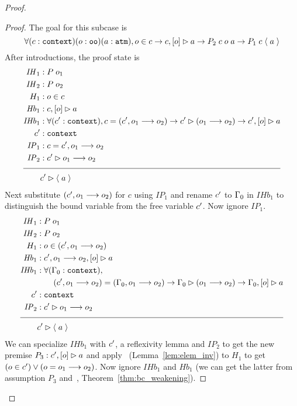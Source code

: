\begin{proof}
\begin{proof}
The goal for this subcase is
$$
\forall (c : \sltm{context}) (o : \sltm{oo}) (a : \sltm{atm}), o \in c \rightarrow \bchsl[c]{o}{a} \rightarrow P_2 \; c \; o \; a \rightarrow P_1 \; c \; \atom{a}
$$
After introductions, the proof state is
\begin{align*}
\mathit{IH}_1 &: P \; o_1 \\
\mathit{IH}_2 &: P \; o_2 \\
H_1 &: o \in c \\
\mathit{Hb}_1 &: \bchsl[c]{o}{a} \\
\mathit{IHb}_1 &: \forall (\inddyncon{} : \sltm{context}), c = (\inddyncon{} , o_1 \longrightarrow o_2) \rightarrow \seqsl[\inddyncon{}]{(o_1 \longrightarrow o_2)} \rightarrow \bchsl[\inddyncon{}]{o}{a} \\
\inddyncon{} &: \sltm{context} \\
\mathit{IP}_1 &: c = \inddyncon{} , o_1 \longrightarrow o_2 \\
\mathit{IP}_2 &: \seqsl[\inddyncon{}]{o_1 \longrightarrow o_2} \\[\pfshift{}]
\cline{1-2}
& \seqsl[\inddyncon{}]{\atom{a}}
\end{align*}
Next substitute $(\inddyncon{} , o_1 \longrightarrow o_2)$ for $c$ using $\mathit{IP}_1$ and rename $\inddyncon{}$ to $\dyncon{}_0$ in $\mathit{IHb}_1$ to distinguish the bound variable from the free variable $\inddyncon{}$. Now ignore $\mathit{IP}_1$.
\begin{align*}
\mathit{IH}_1 &: P \; o_1 \\
\mathit{IH}_2 &: P \; o_2 \\
H_1 &: o \in (\inddyncon{} , o_1 \longrightarrow o_2) \\
\mathit{Hb}_1 &: \bchsl[\inddyncon{} , o_1 \longrightarrow o_2]{o}{a} \\
\mathit{IHb}_1 &: \forall (\dyncon{}_0 : \sltm{context}), \\
& \qquad (\inddyncon{} , o_1 \longrightarrow o_2) = (\dyncon{}_0 , o_1 \longrightarrow o_2) \rightarrow \seqsl[\dyncon{}_0]{(o_1 \longrightarrow o_2)} \rightarrow \bchsl[\dyncon{}_0]{o}{a} \\
\inddyncon{} &: \sltm{context} \\
\mathit{IP}_2 &: \seqsl[\inddyncon{}]{o_1 \longrightarrow o_2} \\[\pfshift{}]
\cline{1-2}
& \seqsl[\inddyncon{}]{\atom{a}}
\end{align*}
We can specialize $\mathit{IHb}_1$ with $\inddyncon{}$, a reflexivity lemma and $\mathit{IP}_2$ to get the new premise $P_3 : \bchsl[\inddyncon{}]{o}{a}$ and apply~ (Lemma~\ref{lem:elem_inv}) to $H_1$ to get $(o \in \inddyncon{}) \vee (o = o_1 \longrightarrow o_2)$. Now ignore $\mathit{IHb}_1$ and $\mathit{Hb}_1$ (we can get the latter from assumption $P_3$ and~, Theorem~\ref{thm:bc_weakening}).


\end{proof}
\end{proof}
